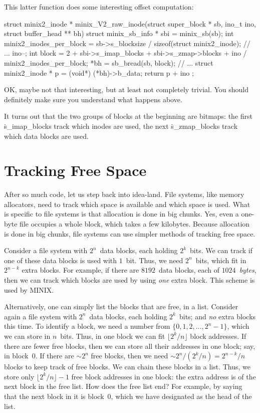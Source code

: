 This latter function does some interesting offset computation:
\begin{ccode}
struct minix2_inode *
minix_V2_raw_inode(struct super_block * sb, ino_t ino, struct buffer_head ** bh) {
  struct minix_sb_info * sbi = minix_sb(sb);
  int minix2_inodes_per_block = sb->s_blocksize / sizeof(struct minix2_inode);
  // ...
  ino--;
  int block = 2 + sbi->s_imap_blocks + sbi->s_zmap->blocks
    + ino / minix2_inodes_per_block;
  *bh = sb_bread(sb, block);
  // ...
  struct minix2_inode * p = (void*) (*bh)->b_data;
  return p + ino %
};
\end{ccode}
OK, maybe not that interesting, but at least not completely trivial.
You should definitely make sure you understand what happens above.

\smallskip

It turns out that the two groups of blocks at the beginning are bitmaps:
  the first \.{s\_imap\_blocks} track which inodes are used,
  the next \.{s\_zmap\_blocks} track which data blocks are used.

\section{Tracking Free Space}

After so much code, let us step back into idea-land.
File systems, like memory allocators,
  need to track which space is available and which space is used.
What is specific to file systems is that allocation is done in big chunks.
Yes, even a one-byte file occupies a whole block, which takes a few kilobytes.
Because allocation is done in big chunks,
  file systems can use simpler methods of tracking free space.

Consider a file system with $2^n$~data blocks, each holding $2^k$~bits.
We can track if one of these data blocks is used with $1$~bit.
Thus, we need $2^n$~bits, which fit in $2^{n-k}$ extra blocks.
For example, if there are $8192$~data blocks, each of $1024$~\emph{bytes},
  then we can track which blocks are used by using \emph{one} extra block.
This scheme is used by MINIX\null.

Alternatively, one can simply list the blocks that are free, in a list.
Consider again a file system with $2^n$~data blocks, each holding $2^k$~bits;
  and \emph{no} extra blocks this time.
To identify a block, we need a number from $\{0,1,2,\ldots,2^n-1\}$,
  which we can store in $n$~bits.
Thus, in one block we can fit $\lfloor 2^k/n\rfloor$ block addresses.
If there are fewer free blocks, then we can store all their addresses in one block;
  say, in block~$0$.
If there are $\sim 2^n$ free blocks,
  then we need $\sim 2^n/(2^k/n)=2^{n-k}/n$ blocks to keep track of free blocks.
We can chain these blocks in a list.
Thus, we store only $\lfloor 2^k/n \rfloor - 1$ free block addresses in one block:
  the extra address is of the next block in the free list.
How does the free list end?
For example, by saying that the next block in it is block~$0$,
  which we have designated as the head of the list.


